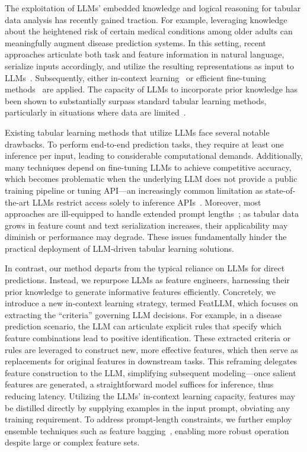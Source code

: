 The exploitation of LLMs’ embedded knowledge and logical reasoning for tabular data analysis has recently gained traction. For example, leveraging knowledge about the heightened risk of certain medical conditions among older adults can meaningfully augment disease prediction systems. In this setting, recent approaches articulate both task and feature information in natural language, serialize inputs accordingly, and utilize the resulting representations as input to LLMs~\cite{dinh2022lift,wang2023anypredict}. Subsequently, either in-context learning~\cite{nam2023semi} or efficient fine-tuning methods~\cite{dinh2022lift,hegselmann2023tabllm} are applied. The capacity of LLMs to incorporate prior knowledge has been shown to substantially surpass standard tabular learning methods, particularly in situations where data are limited~\cite{hegselmann2023tabllm}.

Existing tabular learning methods that utilize LLMs face several notable drawbacks. To perform end-to-end prediction tasks, they require at least one inference per input, leading to considerable computational demands. Additionally, many techniques depend on fine-tuning LLMs to achieve competitive accuracy, which becomes problematic when the underlying LLM does not provide a public training pipeline or tuning API—an increasingly common limitation as state-of-the-art LLMs restrict access solely to inference APIs~\cite{anil2023palm,openai2023gpt4}. Moreover, most approaches are ill-equipped to handle extended prompt lengths~\cite{liu2023lost}; as tabular data grows in feature count and text serialization increases, their applicability may diminish or performance may degrade. These issues fundamentally hinder the practical deployment of LLM-driven tabular learning solutions.

In contrast, our method departs from the typical reliance on LLMs for direct predictions. Instead, we repurpose LLMs as feature engineers, harnessing their prior knowledge to generate informative features efficiently. Concretely, we introduce a new in-context learning strategy, termed \textsf{FeatLLM}, which focuses on extracting the ``criteria'' governing LLM decisions. For example, in a disease prediction scenario, the LLM can articulate explicit rules that specify which feature combinations lead to positive identification. These extracted criteria or rules are leveraged to construct new, more effective features, which then serve as replacements for original features in downstream tasks. This reframing delegates feature construction to the LLM, simplifying subsequent modeling—once salient features are generated, a straightforward model suffices for inference, thus reducing latency. Utilizing the LLMs’ in-context learning capacity, features may be distilled directly by supplying examples in the input prompt, obviating any training requirement. To address prompt-length constraints, we further employ ensemble techniques such as feature bagging~\cite{breiman2001random}, enabling more robust operation despite large or complex feature sets.

